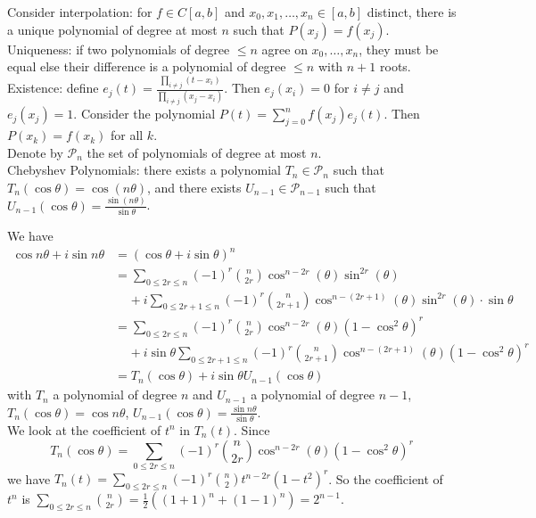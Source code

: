 \documentclass[a4paper, 10pt, twocolumn]{amsart}
\theoremstyle{definition}
\renewcommand{\cal}[1]{\mathcal{#1}}
\newcommand{\1}{\mathbbm{1}}
\begin{document}
Consider interpolation: for $f \in C[a,b]$ and $x_0,x_1,\ldots,x_n \in [a,b]$ distinct, there is a unique polynomial of degree at most $n$ such that $P(x_j) = f(x_j)$. \\

Uniqueness: if two polynomials of degree $\le n$ agree on $x_0,\ldots,x_n$, they must be equal else their difference is a polynomial of degree $\le n$ with $n+1$ roots. \\

Existence: define $e_j(t) = \frac{\prod_{i\ne j} (t-x_i)}{\prod_{i\ne j} (x_j-x_i)}$. Then $e_j(x_i) = 0$ for $i\ne j$ and $e_j(x_j) = 1$. Consider the polynomial $P(t) = \sum_{j=0}^n f(x_j)e_j(t)$. Then $P(x_k) = f(x_k)$ for all $k$.\\

Denote by $\cal{P}_n$ the set of polynomials of degree at most $n$.\\

Chebyshev Polynomials: there exists a polynomial $T_n \in \cal{P}_n$ such that $T_n(\cos{\theta}) = \cos(n\theta)$, and there exists $U_{n-1} \in \cal{P}_{n-1}$ such that $U_{n-1}(\cos{\theta}) = \frac{\sin(n\theta)}{\sin{\theta}}$. 





We have \begin{align*}
    \cos{n\theta} + i\sin{n\theta} &= (\cos{\theta}+i\sin{\theta})^n\\
    & = \sum_{0\le 2r\le n} (-1)^r \binom{n}{2r} \cos^{n-2r}(\theta)\sin^{2r}(\theta)\\
    & \ \ \ \ \ + i\sum_{0\le 2r+1\le n} (-1)^r\binom{n}{2r+1} \cos^{n-(2r+1)}(\theta)  \sin^{2r}(\theta) \cdot \sin{\theta}\\
    &= \sum_{0\le 2r\le n} (-1)^r\binom{n}{2r} \cos^{n-2r}(\theta)
     (1-\cos^2{\theta})^r \\
    & \ \ \ \ \ + i\sin{\theta}\sum_{0\le 2r+1\le n} (-1)^r\binom{n}{2r+1} \cos^{n-(2r+1)}(\theta) (1-\cos^2{\theta})^r \\
    &= T_n(\cos{\theta})+i\sin{\theta}U_{n-1}(\cos{\theta})
\end{align*}
with $T_n$ a polynomial of degree $n$ and $U_{n-1}$ a polynomial of degree $n-1$, $T_n(\cos{\theta}) = \cos{n\theta}$, $U_{n-1}(\cos{\theta}) = \frac{\sin{n\theta}}{\sin{\theta}}$. \\

We look at the coefficient of $t^n$ in $T_n(t)$. Since \[T_n(\cos{\theta}) = \sum_{0\le 2r\le n} (-1)^r\binom{n}{2r} \cos^{n-2r}(\theta)
(1-\cos^2{\theta})^r\]
we have $T_n(t) = \sum_{0 \le 2r \le n} (-1)^r \binom{n}{2} t^{n-2r} (1-t^2)^r$. So the coefficient of $t^n$ is $\sum_{0\le 2r\le n} \binom{n}{2r} = \frac{1}{2}\left((1+1)^n+(1-1)^n\right) = 2^{n-1}$.\\
\end{document}
